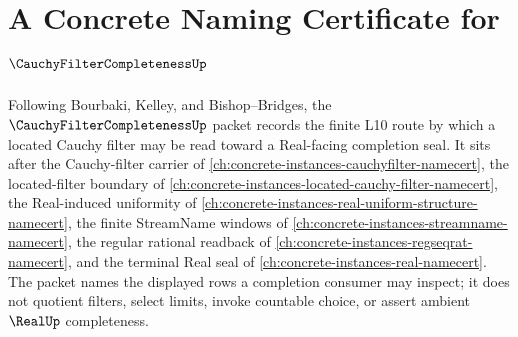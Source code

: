 \chapter{A Concrete Naming Certificate for $\CauchyFilterCompletenessUp$}
\label{ch:concrete-instances-cauchy-filter-completeness-namecert}

Following Bourbaki, Kelley, and Bishop--Bridges, the $\CauchyFilterCompletenessUp$ packet records the finite L10 route by which a located Cauchy filter may be read toward a Real-facing completion seal. It sits after the Cauchy-filter carrier of \autoref{ch:concrete-instances-cauchyfilter-namecert}, the located-filter boundary of \autoref{ch:concrete-instances-located-cauchy-filter-namecert}, the Real-induced uniformity of \autoref{ch:concrete-instances-real-uniform-structure-namecert}, the finite StreamName windows of \autoref{ch:concrete-instances-streamname-namecert}, the regular rational readback of \autoref{ch:concrete-instances-regseqrat-namecert}, and the terminal Real seal of \autoref{ch:concrete-instances-real-namecert}. The packet names the displayed rows a completion consumer may inspect; it does not quotient filters, select limits, invoke countable choice, or assert ambient $\RealUp$ completeness.

